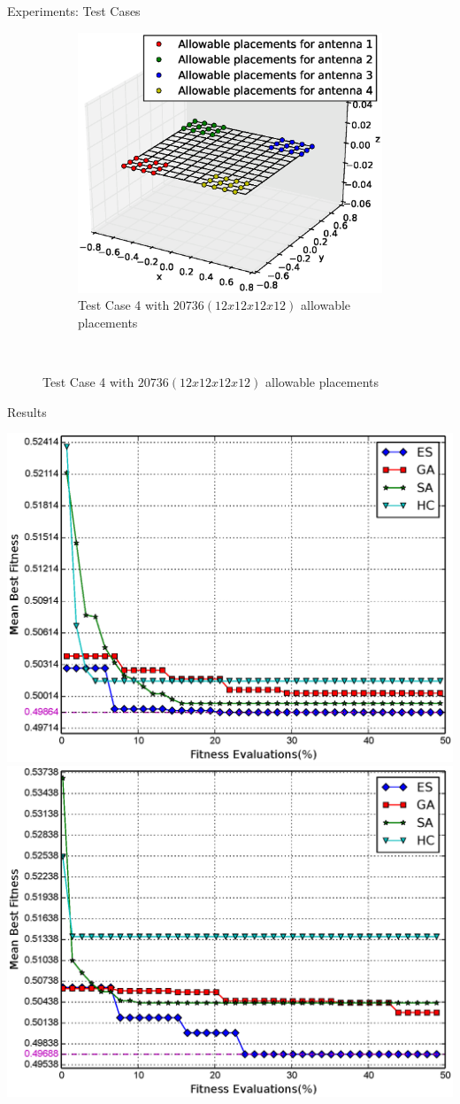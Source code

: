 \documentclass{beamer}
\begin{document}
\begin{frame}{Experiments: Test Cases}
\begin{figure}
\begin{subfigure}{.5\columnwidth}
                \includegraphics[width=\columnwidth, height=\columnwidth]{../paper/FIG/tc_4_figure}%
                \caption{\tiny Test Case 4 with $20736 (12x12x12x12)$ allowable placements}%
                \label{fig:tc4_figure}%
            \end{subfigure}\hfill\\%
        \end{figure}
    \end{frame}

    \begin{frame}{Results}
        \begin{center}
            \includegraphics[width=.49\textwidth]{../paper/FIG/tc1_mf.eps}
            \includegraphics[width=.49\textwidth]{../paper/FIG/tc2_mf.eps}
        \end{center}
    \end{frame}
\end{document}
